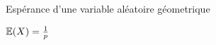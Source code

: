 \begin{note}
  \begin{field}
    Espérance d'une variable aléatoire géometrique
  \end{field}
  \begin{field}
    $\mathbb{E}(X)=\frac{1}{p}$
  \end{field}
  \begin{field}

  \end{field}
  \xplain{}                               %
\end{note}




